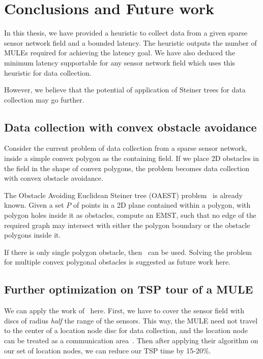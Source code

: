 \chapter{Conclusions and Future work}
\label{chap:concl}

In this thesis, we have provided a heuristic to collect data from a given sparse sensor network field and a bounded latency. The heuristic outputs the number of MULEs required for achieving the latency goal. We have also deduced the minimum latency supportable for any sensor network field which uses this heuristic for data collection.

However, we believe that the potential of application of Steiner trees for data collection may go further.

\section{Data collection with convex obstacle avoidance}

Consider the current problem of data collection from a sparse sensor network, inside a simple convex polygon as the containing field. If we place 2D obstacles in the field in the shape of convex polygons, the problem becomes data collection with convex obstacle avoidance.

The Obstacle Avoiding Euclidean Steiner tree (OAEST) problem~\cite{oaest99} is already known. Given a set $P$ of points in a 2D plane contained within a polygon, with polygon holes inside it as obstacles, compute an EMST, such that no edge of the required graph may intersect with either the polygon boundary or the obstacle polygons inside it.

If there is only single polygon obstacle, then~\cite{oatsp} can be used. Solving the problem for multiple convex polygonal obstacles is suggested as future work here.

\section{Further optimization on TSP tour of a MULE}

We can apply the work of~\cite{conHull} here. First, we have to cover the sensor field with discs of radius \emph{half} the range of the sensors. This way, the MULE need not travel to the center of a location node disc for data collection, and the location node can be treated as a communication area~\cite{conHull}. Then after applying their algorithm on our set of location nodes, we can reduce our TSP time by 15-20\%.

